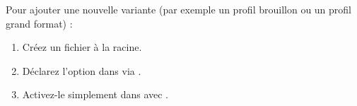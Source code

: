 \begin{callout}
Pour ajouter une nouvelle variante (par exemple un profil brouillon  ou un profil grand format) :
\begin{enumerate}
  \item Créez un fichier  à la racine.
  \item Déclarez l'option dans  via .
  \item Activez-le simplement dans  avec .
\end{enumerate}
\end{callout}
